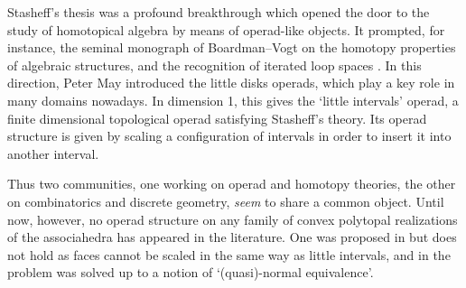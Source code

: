 \documentclass[11pt]{article}
\numberwithin{equation}{section}\providecommand{\No}{}
\theoremstyle{plain}
\theoremstyle{definition}
\begin{document}
Stasheff's thesis was a profound breakthrough which opened the door to the study of homotopical algebra by means of operad-like objects.
It prompted, for instance, the seminal monograph of Boardman--Vogt \cite{BoardmanVogt73} on the homotopy properties of algebraic structures, and the recognition of iterated loop spaces \cite{May72}. In this direction, Peter May introduced the little disks operads, which play a key role in many domains nowadays. In dimension 1, this gives the `little intervals' operad, a finite dimensional topological operad satisfying Stasheff's theory. Its operad structure is given by scaling a configuration of intervals in order to insert it into another interval.

Thus two communities, one working on operad and homotopy theories, the other on combinatorics and discrete geometry, \emph{seem} to share a common object. Until now, however, no operad structure on any family of convex polytopal realizations of the associahedra has appeared in the literature. One was proposed in \cite[Part~II \S1.6]{MSS} but does not hold as faces cannot be scaled in the same way as little intervals, and in \cite{AguiarArdila17} the problem was solved up to a notion of `(quasi)-normal equivalence'.
\end{document}

